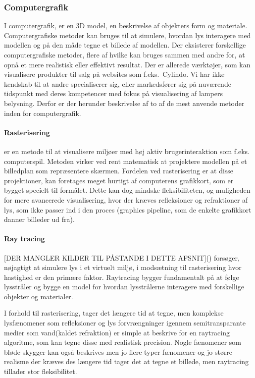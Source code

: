 \subsubsection{Computergrafik}
\label{sec:computergrafik}
I computergrafik, er en 3D model, en beskrivelse af objekters form og materiale\cite{computergrafik_introduktion}. Computergrafiske metoder kan bruges til at simulere, hvordan lys interagere med modellen og på den måde tegne et billede af modellen. Der eksisterer forskellige computergrafiske metoder, flere af hvilke kan bruges sammen med andre for, at opnå et mere realistisk eller effektivt resultat. Der er allerede værktøjer, som kan visualisere produkter til salg på websites som f.eks.\ Cylindo\cite{Cylindo}. Vi har ikke kendskab til at andre specialiserer sig, eller markedsfører sig på nuværende tidspunkt med deres kompetencer med fokus på visualisering af lampers belysning. Derfor er der herunder beskrivelse af to af de mest anvende metoder inden for computergrafik.

\paragraph{Rasterisering}
er en metode til at visualisere miljøer med høj aktiv brugerinteraktion som f.eks. computerspil\cite{rastarization}. Metoden virker ved rent matematisk at projektere modellen på et billedplan som repræsentere skærmen\cite{rastarization}. Fordelen ved rasterisering er at disse projektioner, kan foretages meget hurtigt af computerens grafikkort, som er bygget specielt til formålet\cite{rastarization}. Dette kan dog mindske fleksibiliteten, og muligheden for mere avancerede visualisering, hvor der kræves refleksioner og refraktioner af lys, som ikke passer ind i den proces (graphics pipeline\cite{rastarization}, som de enkelte grafikkort danner billeder ud fra). 

\paragraph{Ray tracing}\cite{raytracing_for_begyndere} [DER MANGLER KILDER TIL PÅSTANDE I DETTE AFSNIT]() forsøger, nøjagtigt at simulere lys i et virtuelt miljø, i modsætning til rasterisering hvor hastighed er den primære faktor. Raytracing bygger fundamentalt på at følge lysstråler og bygge en model for hvordan lysstrålerne interagere med forskellige objekter og materialer. 

I forhold til rasterisering, tager det længere tid at tegne, men komplekse lysfænomener som refleksioner og lys forvrængninger igennem semitransparante medier som vand(kaldet refraktion) er simple at beskrive for en raytracing algoritme, som kan tegne disse med realistisk precision. Nogle fænomener som bløde skygger kan også beskrives men jo flere typer fænomener og jo større realisme der kræves des længere tid tager det at tegne et billede, men raytracing tillader stor fleksibilitet.

